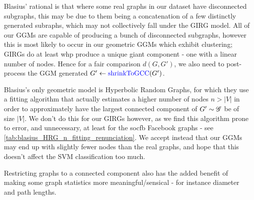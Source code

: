 Blasius' rational is that where some real graphs in our dataset have disconnected subgraphs, this may be due to them being a concatenation of a few distinctly generated subraphs, which may not collectively fall under the GIRG model. All of our GGMs are capable of producing a bunch of disconnected subgraphs, however this is most likely to occur in our geometric GGMs which exhibit clustering; GIRGs do at least whp produce a unique giant component - one with a linear number of nodes. Hence for a fair comparison $d(G, G')$, we also need to post-process the GGM generated $G' \gets \operatorname{\textcolor{blue}{shrinkToGCC}}(G')$. 

Blasius's only geometric model is Hyperbolic Random Graphs, for which they use a fitting algorithm that actually estimates a higher number of nodes $n > |V|$ in order to approximately have the largest connected component of $G' \sim \mathscr{G}$ be of size $|V|$.
We don't do this for our GIRGs however, as we find this algorithm prone to error, and unnecessary, at least for the socfb Facebook graphs - see \cref{tab:blasius_HRG_n_fitting_renunciation}. We accept instead that our GGMs may end up with slightly fewer nodes than the real graphs, and hope that this doesn't affect the SVM classification too much.



Restricting graphs to a connected component also has the added benefit of making some graph statistics more meaningful/sensical - for instance diameter and path lengths.


